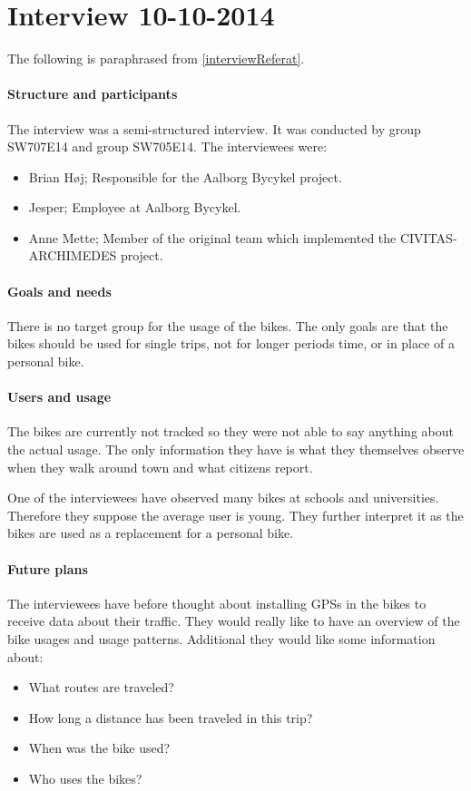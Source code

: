 \section{Interview 10-10-2014}
The following is paraphrased from \cref{interviewReferat}.

\paragraph{Structure and participants}
The interview was a semi-structured interview. 
It was conducted by group SW707E14 and group SW705E14.
The interviewees were:
\begin{itemize}
\item Brian Høj; Responsible for the Aalborg Bycykel project.
\item Jesper; Employee at Aalborg Bycykel.
\item Anne Mette; Member of the original team which implemented the CIVITAS-ARCHIMEDES project.
\end{itemize}


\paragraph{Goals and needs}
There is no target group for the usage of the bikes.
The only goals are that the bikes should be used for single trips, not for longer periods time, or in place of a personal bike.


\paragraph{Users and usage}
The bikes are currently not tracked so they were not able to say anything about the actual usage.
The only information they have is what they themselves observe when they walk around town and what citizens report.

One of the interviewees have observed many bikes at schools and universities.
Therefore they suppose the average user is young.
They further interpret it as the bikes are used as a replacement for a personal bike.


\paragraph{Future plans}
The interviewees have before thought about installing GPSs in the bikes to receive data about their traffic.
They would really like to have an overview of the bike usages and usage patterns.
Additional they would like some information about:
\begin{itemize}
\item What routes are traveled?
\item How long a distance has been traveled in this trip?
\item When was the bike used?
\item Who uses the bikes?
\end{itemize}


